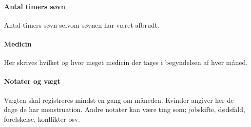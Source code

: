 \paragraph{Antal timers søvn}
Antal timers søvn selvom søvnen har været afbrudt.

\paragraph{Medicin}
Her skrives hvilket og hvor meget medicin der tages i begyndelsen af hver måned.

\paragraph{Notater og vægt} 
Vægten skal registreres mindst en gang om måneden.
Kvinder angiver her de dage de har menstruation.
Andre notater kan være ting som; jobskifte, dødsfald, forelskelse, konflikter osv.